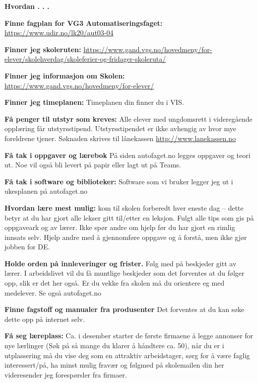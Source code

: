 

\centerline{\bf Hvordan . . .} \bigskip 

\noindent
{\bf Finne fagplan for VG3 Automatiseringsfaget:} \url{https://www.udir.no/lk20/aut03-04}
\vskip 10pt

\noindent
{\bf Finner jeg skoleruten:} \url{https://www.gand.vgs.no/hovedmeny/for-elever/skolehverdag/skoleferier-og-fridager-skoleruta/}
\vskip 10pt

\noindent
{\bf Finner jeg informasjon om Skolen:} \url{https://www.gand.vgs.no/hovedmeny/for-elever/}
\vskip 10pt

\noindent
{\bf Finner jeg timeplanen:} Timeplanen din finner du i VIS. 
\vskip 10pt

\noindent
{\bf Få penger til utstyr som kreves:} Alle elever med ungdomsrett i videregående opplæring får utstyrsstipend. Utstyrsstipendet er ikke avhengig av hvor mye foreldrene tjener.
Søknaden skrives til lånekassen \url{http://www.lanekassen.no}
\vskip 10pt

\noindent
{\bf Få tak i oppgaver og lærebok} På siden autofaget.no legges oppgaver og teori ut. Noe vil også bli levert på papir eller lagt ut på Teams. 
\vskip 10pt

\noindent
{\bf Få tak i  software og biblioteker:} Software som vi bruker legger jeg ut i ukesplanen på autofaget.no  
\vskip 10pt

\noindent
{\bf Hvordan lære mest mulig:} kom til skolen forberedt hver eneste dag -- dette betyr at du har gjort alle lekser gitt til/etter en leksjon. Fulgt alle tips som gis på oppgaveark og av lærer. Ikke spør andre om hjelp før du har gjort en rimlig innsats selv. Hjelp andre med å gjennomføre oppgave og å forstå, men ikke gjør jobben for DE. 
\vskip 10pt

\noindent
{\bf Holde orden på innleveringer og frister.} Følg med på beskjeder gitt av lærer. I arbeidslivet vil du få muntlige beskjeder som det forventes at du følger opp, slik er det her også. Er du vekke fra skolen må du orientere eg med medelever. Se også autofaget.no
\vskip 10pt


\noindent
{\bf Finne fagstoff og manualer fra produsenter } Det forventes at du kan søke dette opp på internet selv. 
\vskip 10pt



\noindent
{\bf Få seg læreplass:} Ca. i desember starter de første firmaene å legge annonser for nye lærlinger (Søk på så mange du klarer å håndtere ca. 50), når du er i utplassering må du vise deg som en attraktiv arbeidstager, sørg for å være faglig interessert/på, ha minst mulig fravær og følgmed på skolemailen din her videresender jeg forespørsler fra firmaer. 

